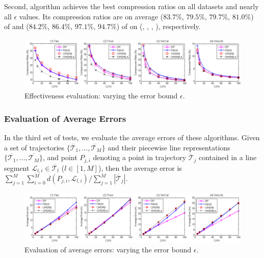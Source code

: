 Second, algorithm \operba achieves the best compression ratios on all datasets and nearly all $\epsilon$ values.
Its compression ratios are on average ($83.7\%$, $79.5\%$, $79.7\%$, $81.0\%$) of \fbqsa and ($84.2\%$, $86.4\%$, $97.1\%$, $94.7\%$) of \dpa on (\taxi, \truck, \ucar, \geolife), respectively.



\begin{figure}[tb!]
\centering
\includegraphics[scale=0.465]{figures/exp-CompressionRatio.png}
\vspace{-2.5ex}
\caption{\small Effectiveness evaluation: varying the error bound $\epsilon$.}
\label{fig:cr}
\vspace{-.5ex}
\end{figure}






\vspace{-0.5ex}
\subsubsection{Evaluation of Average Errors}


In the third set of tests, we evaluate the average errors of these algorithms.
Given a set of trajectories $\{\dddot{\mathcal{T}_1}, \ldots, \dddot{\mathcal{T}_M}\}$ and their piecewise line representations
$\{\overline{\mathcal{T}_1}, \ldots, \overline{\mathcal{T}_M}\}$, and point $P_{j,i}$ denoting
a point in trajectory $\dddot{\mathcal{T}}_j$ contained in a line segment $\mathcal{L}_{l,i}\in\overline{\mathcal{T}_l}$ ($l\in[1,M]$),
then the average error is $\sum_{j=1}^{M}\sum_{i=0}^{M} d(P_{j,i},
\mathcal{L}_{l,i})/\sum_{j=1}^{M}{|\dddot{\mathcal{T}}_j |}$.


\begin{figure}[tb]
	\centering
	\includegraphics[scale = 0.465]{figures/exp-averageerror.png}
	\vspace{-2ex}
	\caption{\small Evaluation of average errors: varying the error bound $\epsilon$.}
	\label{fig:ae}
	\vspace{-2ex}
\end{figure}

